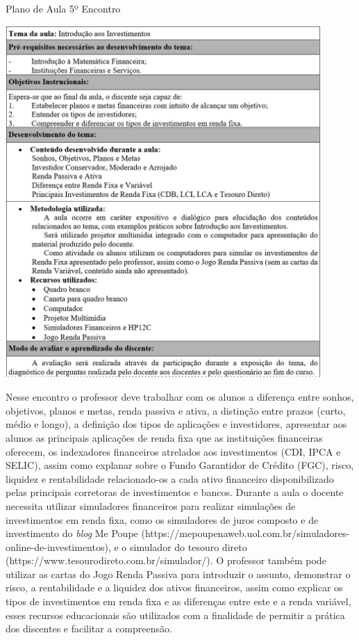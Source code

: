 \graphicspath{{quadros/}} 
\begin{quadro}[!ht]
\centering
\begin{minipage}{0.8\textwidth}
\caption{Plano de Aula 5º Encontro}
\centering
\includegraphics[width=0.9\textwidth]{quadro-11-aula 5}
\label{quad: quadro-11-aula 5}
\end{minipage}
\end{quadro}

\newpage
Nesse encontro o professor deve trabalhar com os alunos a diferença entre sonhos, objetivos, planos e metas, renda passiva e ativa, a distinção entre prazos (curto, médio e longo), a definição dos tipos de aplicações e investidores, apresentar aos alunos as principais aplicações de renda fixa que as instituições financeiras oferecem, os indexadores financeiros atrelados aos investimentos (CDI, IPCA e SELIC), assim como explanar sobre o Fundo Garantidor de Crédito (FGC), risco, liquidez e rentabilidade relacionado-os a cada ativo financeiro disponibilizado pelas principais corretoras de investimentos e bancos. Durante a aula o docente necessita utilizar simuladores financeiros para realizar simulações de investimentos em renda fixa, como os simuladores de juros composto e de investimento do \textit{blog} Me Poupe (https://mepoupenaweb.uol.com.br/simuladores-online-de-investimentos), e o simulador do tesouro direto (https://www.tesourodireto.com.br/simulador/). O professor também pode utilizar as cartas do Jogo Renda Passiva para introduzir o assunto, demonstrar o risco, a rentabilidade e a liquidez dos ativos financeiros, assim como explicar os tipos de investimentos em renda fixa e as diferenças entre este e a renda variável, esses recursos educacionais são utilizados com a finalidade de permitir a prática dos discentes e facilitar a compreensão.

